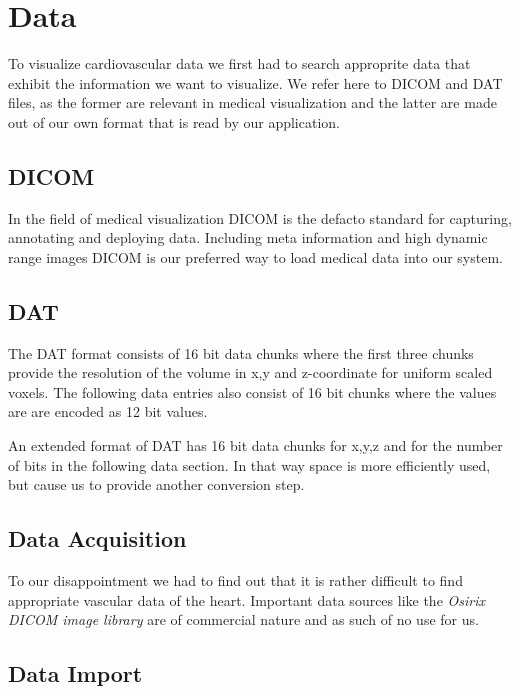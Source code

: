\section{Data}

To visualize cardiovascular data we first had to search approprite data that exhibit the information we want to visualize. We refer here to DICOM and DAT files, as the former are relevant in medical visualization and the latter are made out of our own format that is read by our application.

\subsection{DICOM}

In the field of medical visualization DICOM is the defacto standard for capturing, annotating and deploying data.
Including meta information and high dynamic range images DICOM is our preferred way to load medical data into our system.

\subsection{DAT}
\label{seq:DAT}

The DAT format consists of 16 bit data chunks where the first three chunks provide the resolution of the volume in x,y and z-coordinate for uniform scaled voxels. The following data entries also consist of 16 bit chunks where the values are are encoded as 12 bit values. 

An extended format of DAT has 16 bit data chunks for x,y,z and for the number of bits in the following data section. In that way space is more efficiently used, but cause us to provide another conversion step.

\subsection{Data Acquisition}

To our disappointment we had to find out that it is rather difficult to find appropriate vascular data of the heart. Important data sources like  the \emph{Osirix DICOM image library} \cite{osirix_dicom_image_library_2018} are of commercial nature and as such of no use for us.


\subsection{Data Import}

